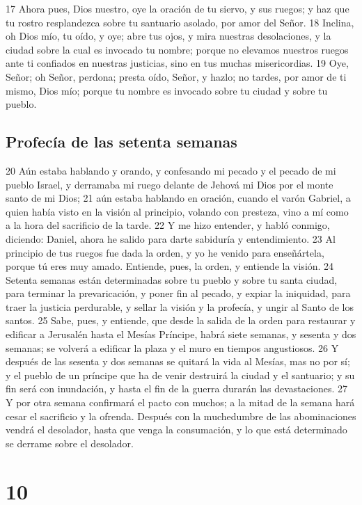 17 Ahora pues, Dios nuestro, oye la oración de tu siervo, y sus ruegos; y haz que tu rostro resplandezca sobre tu santuario asolado, por amor del Señor.
18 Inclina, oh Dios mío, tu oído, y oye; abre tus ojos, y mira nuestras desolaciones, y la ciudad sobre la cual es invocado tu nombre; porque no elevamos nuestros ruegos ante ti confiados en nuestras justicias, sino en tus muchas misericordias.
19 Oye, Señor; oh Señor, perdona; presta oído, Señor, y hazlo; no tardes, por amor de ti mismo, Dios mío; porque tu nombre es invocado sobre tu ciudad y sobre tu pueblo.

\section*{Profecía de las setenta semanas}

20 Aún estaba hablando y orando, y confesando mi pecado y el pecado de mi pueblo Israel, y derramaba mi ruego delante de Jehová mi Dios por el monte santo de mi Dios;
21 aún estaba hablando en oración, cuando el varón Gabriel, a quien había visto en la visión al principio, volando con presteza, vino a mí como a la hora del sacrificio de la tarde.
22 Y me hizo entender, y habló conmigo, diciendo: Daniel, ahora he salido para darte sabiduría y entendimiento. 
23 Al principio de tus ruegos fue dada la orden, y yo he venido para enseñártela, porque tú eres muy amado. Entiende, pues, la orden, y entiende la visión.
24 Setenta semanas están determinadas sobre tu pueblo y sobre tu santa ciudad, para terminar la prevaricación, y poner fin al pecado, y expiar la iniquidad, para traer la justicia perdurable, y sellar la visión y la profecía, y ungir al Santo de los santos.
25 Sabe, pues, y entiende, que desde la salida de la orden para restaurar y edificar a Jerusalén hasta el Mesías Príncipe, habrá siete semanas, y sesenta y dos semanas; se volverá a edificar la plaza y el muro en tiempos angustiosos.
26 Y después de las sesenta y dos semanas se quitará la vida al Mesías, mas no por sí; y el pueblo de un príncipe que ha de venir destruirá la ciudad y el santuario; y su fin será con inundación, y hasta el fin de la guerra durarán las devastaciones.
27 Y por otra semana confirmará el pacto con muchos; a la mitad de la semana hará cesar el sacrificio y la ofrenda. Después con la muchedumbre de las abominaciones vendrá el desolador, hasta que venga la consumación, y lo que está determinado se derrame sobre el desolador.

\chapter{10}

